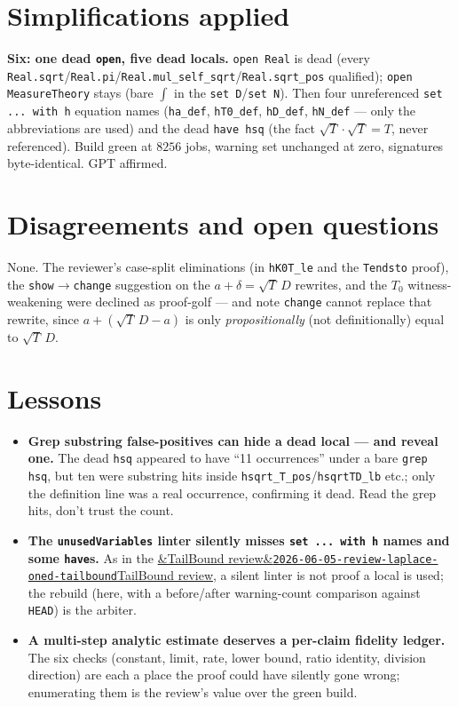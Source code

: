 \documentclass[11pt]{article}
\newcommand{\reviewref}[2][]{\href{https://therisensea.org/reviews/#2/}{\ifx&#1&\texttt{#2}\else#1\fi}}
\begin{document}
\section{Simplifications applied}
\textbf{Six: one dead \texttt{open}, five dead locals.} \texttt{open Real} is dead (every
\texttt{Real.sqrt}/\texttt{Real.pi}/\texttt{Real.mul\_self\_sqrt}/\texttt{Real.sqrt\_pos}
qualified); \texttt{open MeasureTheory} stays (bare $\int$ in the \texttt{set D}/\texttt{set N}).
Then four unreferenced \texttt{set ... with h} equation names (\texttt{ha\_def},
\texttt{hT0\_def}, \texttt{hD\_def}, \texttt{hN\_def} --- only the abbreviations are used) and the
dead \texttt{have hsq} (the fact $\sqrt T\cdot\sqrt T=T$, never referenced). Build green at $8256$ jobs,
warning set unchanged at zero, signatures byte-identical. GPT affirmed.

\section{Disagreements and open questions}
None. The reviewer's case-split eliminations (in \texttt{hK0T\_le} and the \texttt{Tendsto}
proof), the \texttt{show}$\to$\texttt{change} suggestion on the
$a+\delta = \sqrt T\,D$ rewrites, and the $T_0$ witness-weakening were declined as proof-golf
--- and note \texttt{change} cannot replace that rewrite, since $a+(\sqrt T\,D-a)$ is only
\emph{propositionally} (not definitionally) equal to $\sqrt T\,D$.

\section{Lessons}
\begin{itemize}[noitemsep]
  \item \textbf{Grep substring false-positives can hide a dead local --- and reveal one.} The dead
    \texttt{hsq} appeared to have ``11 occurrences'' under a bare \texttt{grep hsq}, but ten were
    substring hits inside \texttt{hsqrt\_T\_pos}/\texttt{hsqrtTD\_lb} etc.; only the definition line
    was a real occurrence, confirming it dead. Read the grep hits, don't trust the count.
  \item \textbf{The \texttt{unusedVariables} linter silently misses \texttt{set ... with h}
    names and some \texttt{have}s.} As in the
    \reviewref[TailBound review]{2026-06-05-review-laplace-oned-tailbound}, a silent linter is not
    proof a local is used; the rebuild (here, with a before/after warning-count comparison against
    \texttt{HEAD}) is the arbiter.
  \item \textbf{A multi-step analytic estimate deserves a per-claim fidelity ledger.} The six checks
    (constant, limit, rate, lower bound, ratio identity, division direction) are each a place the
    proof could have silently gone wrong; enumerating them is the review's value over the green
    build.
\end{itemize}
\end{document}
